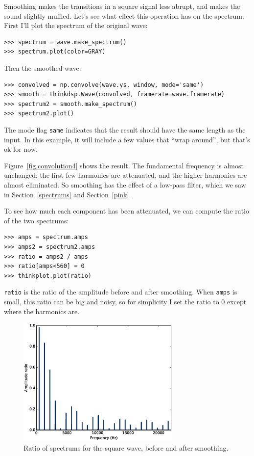 \documentclass[12pt]{book}
\begin{document}
Smoothing makes the transitions in a square signal less abrupt,
and makes the sound slightly muffled.  Let's see what effect this
operation has on the spectrum.  First I'll plot the spectrum
of the original wave:

\begin{verbatim}
>>> spectrum = wave.make_spectrum()
>>> spectrum.plot(color=GRAY)
\end{verbatim}

Then the smoothed wave:

\begin{verbatim}
>>> convolved = np.convolve(wave.ys, window, mode='same')
>>> smooth = thinkdsp.Wave(convolved, framerate=wave.framerate)
>>> spectrum2 = smooth.make_spectrum()
>>> spectrum2.plot()
\end{verbatim}

The mode flag {\tt same} indicates that the result should have the
same length as the input.  In this example, it will include a few values
that ``wrap around'', but that's ok for now.

Figure~\ref{fig.convolution4} shows the result.  The fundamental
frequency is almost unchanged; the first few harmonics are
attenuated, and the higher harmonics are almost eliminated.  So
smoothing has the effect of a low-pass filter, which we
saw in Section~\ref{spectrums} and Section~\ref{pink}.

To see how much each component has been attenuated, we can
compute the ratio of the two spectrums:

\begin{verbatim}
>>> amps = spectrum.amps
>>> amps2 = spectrum2.amps
>>> ratio = amps2 / amps    
>>> ratio[amps<560] = 0
>>> thinkplot.plot(ratio)
\end{verbatim}

{\tt ratio} is the ratio of the amplitude before and after 
smoothing.  When {\tt amps} is small, this ratio can be big
and noisy, so for simplicity I set the ratio to 0 except
where the harmonics are.

\begin{figure}
\centerline{\includegraphics[height=2.5in]{figs/convolution5.eps}}
\caption{Ratio of spectrums for the square wave, before and after smoothing.}
\label{fig.convolution5}
\end{figure}
\end{document}
